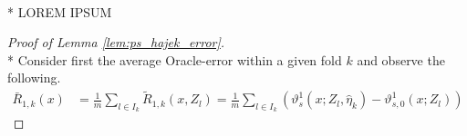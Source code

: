 \begin{boxD}
    \begin{lem}\label{lem:ps_hajek_error}\mbox{}\\*
    {\color{red} LOREM IPSUM}    
\end{lem}
\end{boxD}

\begin{proof}[Proof of Lemma \ref{lem:ps_hajek_error}]\mbox{}\\*
    Consider first the average Oracle-error within a given fold $k$ and observe the following.
    \begin{equation}
        \begin{aligned}
            \bar{R}_{1, k}\left(x\right)
            & = \frac{1}{m}\sum_{l \in I_{k}}\tilde{R}_{1, k}\left(x, Z_{l}\right)
            = \frac{1}{m}\sum_{l \in I_{k}}
            \left(\vartheta_{s}^{1}\left(x; Z_l, \hat{\eta}_{k}\right)
            - \vartheta_{s,0}^{1}\left(x; Z_l\right) 
            \right)
        \end{aligned}

\end{equation}
\end{proof}
